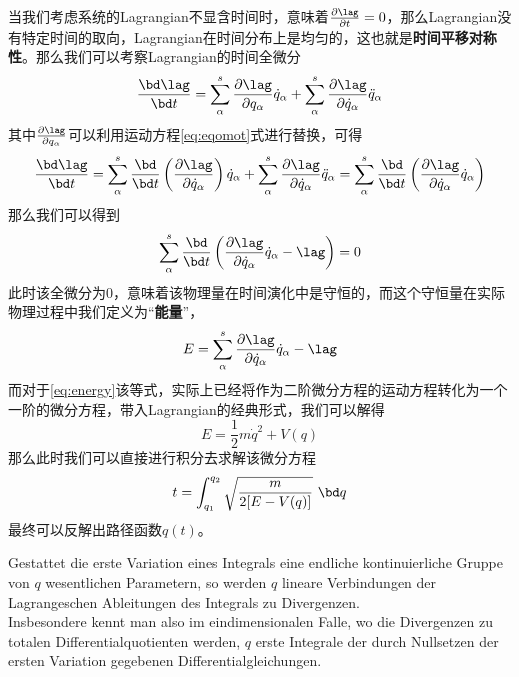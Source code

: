 当我们考虑系统的Lagrangian不显含时间时，意味着$ \frac{\partial\lag}{\partial t }=0$，那么Lagrangian没有特定时间的取向，Lagrangian在时间分布上是均匀的，这也就是\textbf{时间平移对称性}。那么我们可以考察Lagrangian的时间全微分
\begin{equation}
    \frac{\bd \lag }{\bd t} = \sum_\alpha^s \frac{\partial\lag}{\partial q_\alpha}\dot q_\alpha + \sum_\alpha^s \frac{\partial\lag}{\partial \dot q_\alpha}\ddot q_\alpha
\end{equation}
其中$\frac{\partial\lag}{\partial q_\alpha}$可以利用运动方程\eqref{eq:eqomot}式进行替换，可得
\begin{equation}
    \frac{\bd \lag }{\bd t} = \sum_\alpha^s \frac{\bd }{\bd t}\left(\frac{\partial\lag}{\partial \dot q_\alpha} \right) \dot q_\alpha + \sum_\alpha^s \frac{\partial\lag}{\partial \dot q_\alpha}\ddot q_\alpha = \sum_\alpha^s \frac{\bd }{\bd t}\left(\frac{\partial\lag}{\partial \dot q_\alpha}\dot q_\alpha \right)
\end{equation}
那么我们可以得到
\begin{equation}
     \sum_\alpha^s \frac{\bd }{\bd t}\left(\frac{\partial\lag}{\partial \dot q_\alpha}\dot q_\alpha -\lag\right) = 0
\end{equation}
此时该全微分为0，意味着该物理量在时间演化中是守恒的，而这个守恒量在实际物理过程中我们定义为“\textbf{能量}”，
\begin{equation}
    E =  \sum_\alpha^s \frac{\partial\lag}{\partial \dot q_\alpha}\dot q_\alpha -\lag\label{eq:energy}
\end{equation}
而对于\eqref{eq:energy}该等式，实际上已经将作为二阶微分方程的运动方程转化为一个一阶的微分方程，带入Lagrangian的经典形式，我们可以解得
\begin{equation}
    E = \frac{1}{2}m \dot q^2 + V(q)
\end{equation}
那么此时我们可以直接进行积分去求解该微分方程
\begin{equation}
    t = \int_{q_1}^{q_2} \sqrt{\frac{m}{2[E-V(q)]}}~\bd q
\end{equation}
最终可以反解出路径函数$q(t)$。


\begin{theorem}
    Gestattet die erste Variation eines Integrals eine endliche kontinuierliche Gruppe von \(q\) wesentlichen Parametern, so werden \(q\) lineare Verbindungen der Lagrangeschen Ableitungen des Integrals zu Divergenzen.\\ Insbesondere kennt man also im eindimensionalen Falle, wo die Divergenzen zu totalen Differentialquotienten werden, \(q\) erste Integrale der durch Nullsetzen der ersten Variation gegebenen Differentialgleichungen.
\end{theorem}

